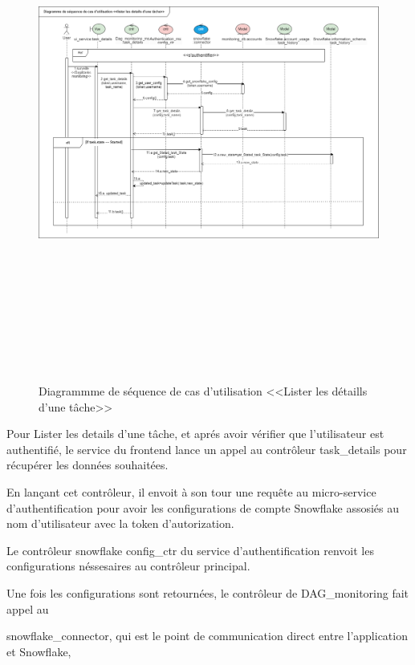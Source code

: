    \begin{figure}[H]
        \centering
        \includegraphics[width=1\linewidth ,height=17cm]{img/conception/seq2.png}
        \caption{Diagrammme de séquence de cas d'utilisation <<Lister les détaills d'une tâche>> }
        \label{fig :seq2}
    \end{figure}
    \par Pour Lister les details d'une tâche, et aprés avoir vérifier que l'utilisateur est authentifié, le service du frontend lance un appel au contrôleur task\_details 
    pour récupérer les données souhaitées. 
    \par En lançant cet contrôleur, il envoit à son tour une requête au micro-service d'authentification pour avoir les configurations de compte Snowflake assosiés au nom d'utilisateur avec la token d'autorization.
    \par Le contrôleur snowflake config\_ctr du service d'authentification renvoit les configurations néssesaires au contrôleur principal.
    \par Une fois les configurations sont retournées, le contrôleur de DAG\_monitoring fait appel au \par snowflake\_connector, qui est le point de communication direct entre l'application et Snowflake, 
